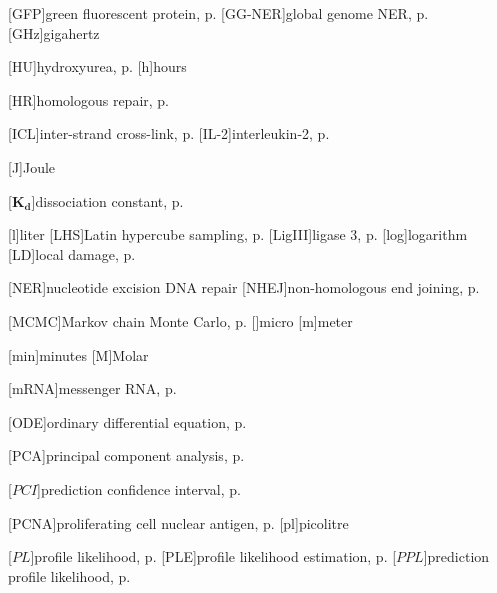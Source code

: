\begin{acronym}
[GFP]{green fluorescent protein, p. \pageref{sec:NERmechanism}}
[GG-NER]{global genome NER, p. \pageref{sec:NERmechanism}}
[GHz]{gigahertz}

[HU]{hydroxyurea, p. \pageref{sec:FLIP}}
[h]{hours}

[HR]{homologous repair, p. \pageref{sec:intro_reg_repair}}

[ICL]{inter-strand cross-link, p. \pageref{sec:intro_reg_repair}}
[IL-2]{interleukin-2, p. \pageref{sec:FOXp3}}

[J]{Joule}


[$\textbf{K}_\textbf{d}$]{dissociation constant, p. \pageref{tab:KdValues}}

[l]{liter}
[LHS]{Latin hypercube sampling, p. \pageref{sec:ANSI}}
[LigIII]{ligase 3, p. \pageref{sec:NERmechanism}}
[log]{logarithm}
[LD]{local damage, p. \pageref{sec:eGFP}}


[NER]{nucleotide excision DNA repair}
[NHEJ]{non-homologous end joining, p. \pageref{sec:intro_reg_repair}}



[MCMC]{Markov chain Monte Carlo, p. \pageref{sec:MCMC}}
[{\textmu}]{micro}
[m]{meter}


[min]{minutes}
[M]{Molar}

[mRNA]{messenger RNA, p. \pageref{sec:mRNA}}





[ODE]{ordinary differential equation, p. \pageref{sec:ODE}}






[PCA]{principal component analysis, p. \pageref{sec:pca}}

[$\boldsymbol{ \mathit{PCI}}$]{prediction confidence interval, p. \pageref{eqn:confidenceIntervalsPPL}}

[PCNA]{proliferating cell nuclear antigen, p. \pageref{sec:NERmechanism}}
[pl]{picolitre}

[$\boldsymbol{ \mathit{PL} }$]{profile likelihood, p. \pageref{sec:PLE}}
[PLE]{profile likelihood estimation, p. \pageref{sec:PLE}}
[$\boldsymbol{ \mathit{PPL} }$]{prediction profile likelihood, p. \pageref{sec:ppl}}


\end{acronym}
